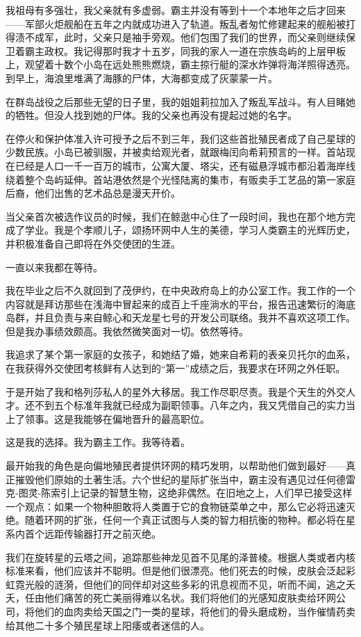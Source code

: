 \documentclass[AutoFakeBold=true]{book}
\begin{document}
{\kaishu 我祖母有多强壮，我父亲就有多虚弱。霸主并没有等到十一个本地年之后才回来——军部火炬舰船在五年之内就成功进入了轨道。叛乱者匆忙修建起来的舰船被打得渍不成军，此时，父亲只是袖手旁观。他们包围了我们的世界，而父亲则继续保卫着霸主政权。我记得那时我才十五岁，同我的家人一道在宗族岛屿的上层甲板上，观望着十数个小岛在远处熊熊燃烧，霸主掠行艇的深水炸弹将海洋照得透亮。到早上，海浪里堆满了海豚的尸体，大海都变成了灰蒙蒙一片。

在群岛战役之后那些无望的日子里，我的姐姐莉拉加入了叛乱军战斗。有人目睹她的牺牲。但没人找到她的尸体。我的父亲也再没有提起过她的名字。

在停火和保护体准入许可授予之后不到三年，我们这些首批殖民者成了自己星球的少数民族。小岛已被驯服，并被卖给观光者，就跟梅闰向希莉预言的一样。首站现在已经是人口一千一百万的城市，公寓大厦、塔尖，还有磁悬浮城市都沿着海岸线绕着整个岛屿延伸。首站港依然是个光怪陆离的集市，有贩卖手工艺品的第一家庭后裔，他们出售的艺术品总是漫天开价。

当父亲首次被选作议员的时候，我们在鲸逖中心住了一段时间，我也在那个地方完成了学业。我是个孝顺儿子，颂扬环网中人生的美德，学习人类霸主的光辉历史，并积极准备自己即将在外交使团的生涯。

一直以来我都在等待。

我在毕业之后不久就回到了茂伊约，在中央政府岛上的办公室工作。我工作的一个内容就是拜访那些在浅海中冒起来的成百上千座淌水的平台，报告迅速繁衍的海底岛群，并且负责与来自鲸心和天龙星七号的开发公司联络。我并不喜欢这项工作。但是我办事绩效颇高。我依然微笑面对一切。依然等待。

我追求了某个第一家庭的女孩子，和她结了婚，她来自希莉的表亲贝托尔的血系，在我获得外交使团考核鲜有人达到的``第一''成绩之后，我要求在环网之外任职。

于是开始了我和格列莎私人的星外大移居。我工作尽职尽责。我是个天生的外交人才。还不到五个标准年我就已经成为副职领事。八年之内，我又凭借自己的实力当上了领事。这是我能够在偏地晋升的最高职位。

这是我的选择。我为霸主工作。我等待着。

最开始我的角色是向偏地殖民者提供环网的精巧发明，以帮助他们做到最好——真正摧毁他们原始的土著生活。六个世纪的星际扩张当中，霸主没有遇见过任何德雷克-图灵-陈索引上记录的智慧生物，这绝非偶然。在旧地之上，人们早已接受这样一个观点：如果一个物种胆敢将人类置于它的食物链菜单之中，那么它必将迅速灭绝。随着环网的扩张，任何一个真正试图与人类的智力相抗衡的物种。都必将在星系内首个远距传输器打开之前灭绝。

我们在旋转星的云塔之间，追踪那些神龙见首不见尾的泽普棱。根据人类或者内核标准来看，他们应该并不聪明。但是他们很漂亮。他们死去的时候，皮肤会泛起彩虹霓光般的涟漪，但他们的同伴却对这些多彩的讯息视而不见，听而不闻，逃之夭夭，任由他们痛苦的死亡美丽得难以名状。我们将他们的光感知皮肤卖给环网公司，将他们的血肉卖给天国之门一类的星球，将他们的骨头磨成粉，当作催情药卖给其他二十多个殖民星球上阳痿或者迷信的人。

}
\end{document}

